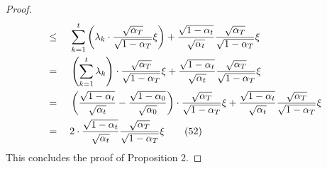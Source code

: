 \documentclass{article}
\newtheorem{proof}{Proof}
\begin{document}
\begin{proof}
\begin{alignat}{2}
&\leq \; && \sum_{k=1}^{t}\left(\lambda_{k}\cdot\frac{\sqrt{\alpha_T}}{\sqrt{1 - \alpha_T}}\xi\right) + \frac{\sqrt{1-\alpha_t}}{\sqrt{\alpha_t}}\frac{\sqrt{\alpha_T}}{\sqrt{1 - \alpha_T}}\xi \notag \\
&= \; && \left(\sum_{k=1}^{t}\lambda_{k}\right)\cdot\frac{\sqrt{\alpha_T}}{\sqrt{1 - \alpha_T}}\xi + \frac{\sqrt{1-\alpha_t}}{\sqrt{\alpha_t}}\frac{\sqrt{\alpha_T}}{\sqrt{1 - \alpha_T}}\xi \notag \\
&= \; && \left(\frac{\sqrt{1-\alpha_t}}{\sqrt{\alpha_t}} - \frac{\sqrt{1-\alpha_0}}{\sqrt{\alpha_0}}\right)\cdot\frac{\sqrt{\alpha_T}}{\sqrt{1 - \alpha_T}}\xi + \frac{\sqrt{1-\alpha_t}}{\sqrt{\alpha_t}}\frac{\sqrt{\alpha_T}}{\sqrt{1 - \alpha_T}}\xi \notag \\
&= \; && 2\cdot\frac{\sqrt{1-\alpha_t}}{\sqrt{\alpha_t}}\frac{\sqrt{\alpha_T}}{\sqrt{1 - \alpha_T}}\xi \tag{52} \label{apdx_eq:38}
\end{alignat}
This concludes the proof of Proposition 2.
\end{proof}
\end{document}
